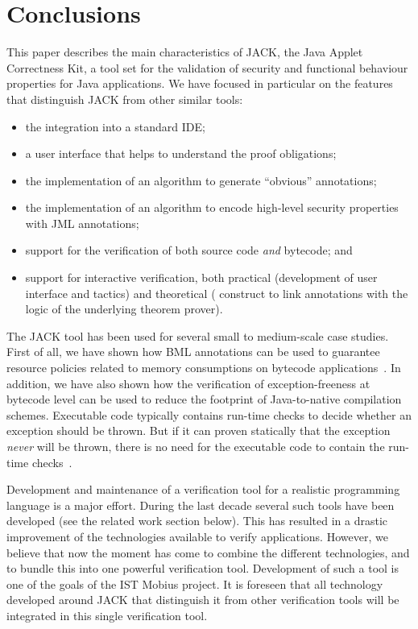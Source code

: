 
\section{Conclusions}\label{SecConcl}

This paper describes the main characteristics of JACK, the Java Applet
Correctness Kit, a tool set for the validation of security and
functional behaviour properties for Java applications. We have focused
in particular on the features that distinguish JACK from other similar
tools:
\begin{itemize}
\item the integration into a standard IDE;
\item a user interface that helps to understand the proof obligations;
\item the implementation of an algorithm to generate
``obvious'' annotations;
\item the implementation of an algorithm to encode high-level security
properties with JML annotations; 
\item support for the verification of both source code \emph{and}
bytecode; and
\item support for interactive verification, both practical
(development of user interface and tactics) and theoretical (\native
construct to link annotations with the logic of the
underlying theorem prover).
\end{itemize}

The JACK tool has been used for several small to medium-scale case
studies. First of all, we have shown how BML annotations can be used
to guarantee resource policies related to memory consumptions on
bytecode applications~\cite{BarthePS05}. In addition, we have also
shown how the verification of exception-freeness at bytecode level can
be used to reduce the footprint of Java-to-native compilation
schemes. Executable code typically contains run-time checks to decide
whether an exception should be thrown. But if it can proven statically
that the exception \emph{never} will be thrown, there is no need for
the executable code to contain the run-time
checks~\cite{DBLP:conf/cardis/CourbotPGV06}.


Development and maintenance of a verification tool for a realistic
programming language is a major effort. During the last decade several
such tools have been developed (see the related work section
below). This has resulted in a drastic improvement of the technologies
available to verify applications. However, we believe that now the
moment has come to combine the different technologies, and to bundle
this into one powerful verification tool. Development of such a tool
is one of the goals of the IST \textsf{Mobius} project. It is foreseen
that all technology developed around JACK that distinguish it from
other verification tools will be integrated in this single
verification tool.

